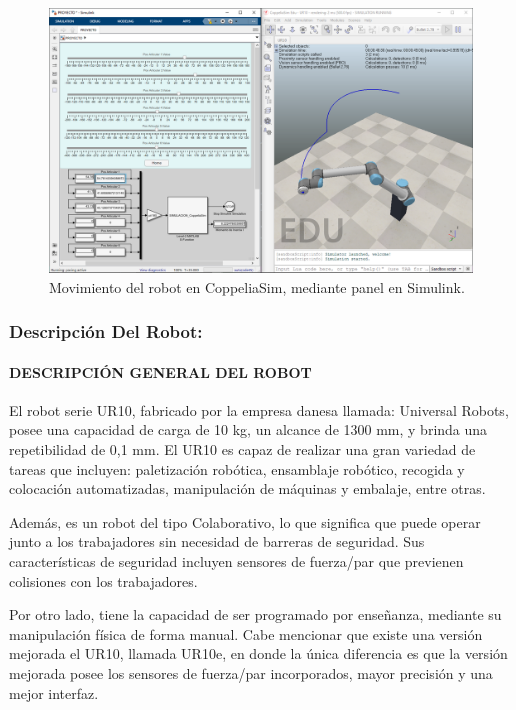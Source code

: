 \documentclass{article}
\begin{document}
\begin{sloppypar}
\begin{figure}[H]
    \centering
    \includegraphics[width=1\textwidth] {Movimiento del robot en CoppeliaSim, mediante panel en Simulink}
    \caption{Movimiento del robot en CoppeliaSim, mediante panel en Simulink.}
    \label{fig:Movimiento del robot en CoppeliaSim, mediante panel en Simulink}
\end{figure}


\subsubsection{Descripción Del Robot:}
\label{sec:Descripción Del Robot:}

\paragraph{DESCRIPCIÓN GENERAL DEL ROBOT}
\label{sec:DESCRIPCIÓN GENERAL DEL ROBOT}
\hfill

El robot serie UR10, fabricado por la empresa danesa llamada: Universal Robots, posee una capacidad de carga de 10 kg, un alcance de 1300 mm, y brinda una repetibilidad de 0,1 mm. El UR10 es capaz de realizar una gran variedad de tareas que incluyen: paletización robótica, ensamblaje robótico, recogida y colocación automatizadas, manipulación de máquinas y embalaje, entre otras.

Además, es un robot del tipo Colaborativo, lo que significa que puede operar junto a los trabajadores sin necesidad de barreras de seguridad. Sus características de seguridad incluyen sensores de fuerza/par que previenen colisiones con los trabajadores.

Por otro lado, tiene la capacidad de ser programado por enseñanza, mediante su manipulación física de forma manual. Cabe mencionar que existe una versión mejorada el UR10, llamada UR10e, en donde la única diferencia es que la versión mejorada posee los sensores de fuerza/par incorporados, mayor precisión y una mejor interfaz.


\end{sloppypar}
\end{document}
